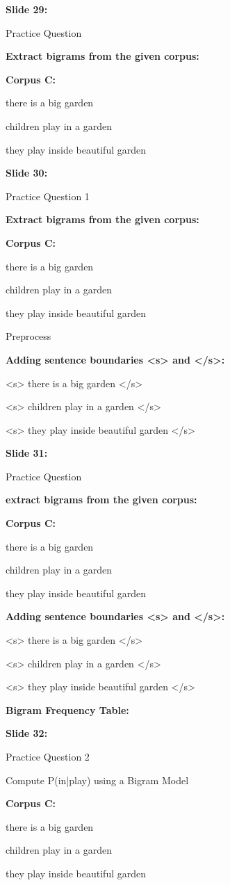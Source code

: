 \documentclass[11pt,a4paper]{article}
\begin{document}
\textbf{Slide 29:}

Practice Question

\textbf{Extract bigrams from the given corpus:} 

\textbf{Corpus C:} 

there is a big garden

children play in a garden

they play inside beautiful garden

\textbf{Slide 30:}

Practice Question 1

\textbf{Extract bigrams from the given corpus:} 

\textbf{Corpus C:} 

there is a big garden

children play in a garden

they play inside beautiful garden

Preprocess

\textbf{Adding sentence boundaries <s> and </s>:} 

<s> there is a big garden </s>

<s> children play in a garden </s>

<s> they play inside beautiful garden </s>

\textbf{Slide 31:}

Practice Question

\textbf{extract bigrams from the given corpus:} 

\textbf{Corpus C:} 

there is a big garden

children play in a garden

they play inside beautiful garden

\textbf{Adding sentence boundaries <s> and </s>:} 

<s> there is a big garden </s>

<s> children play in a garden </s>

<s> they play inside beautiful garden </s>

\textbf{Bigram Frequency Table:} 

\textbf{Slide 32:}

Practice Question 2

Compute P(in|play) using a Bigram Model

\textbf{Corpus C:} 

there is a big garden

children play in a garden

they play inside beautiful garden
\end{document}
